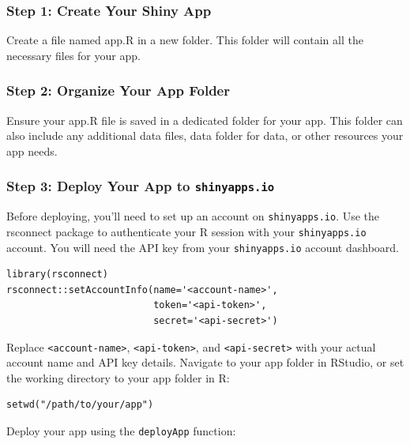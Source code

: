 \documentclass[
]{book}
\begin{document}
\hypertarget{step-1-create-your-shiny-app}{%
\subsubsection{Step 1: Create Your Shiny App}\label{step-1-create-your-shiny-app}}

Create a file named app.R in a new folder. This folder will contain all the necessary files for your app.

\hypertarget{step-2-organize-your-app-folder}{%
\subsubsection{Step 2: Organize Your App Folder}\label{step-2-organize-your-app-folder}}

Ensure your app.R file is saved in a dedicated folder for your app. This folder can also include any additional data files, data folder for data, or other resources your app needs.

\hypertarget{step-3-deploy-your-app-to-shinyapps.io}{%
\subsubsection{\texorpdfstring{Step 3: Deploy Your App to \texttt{shinyapps.io}}{Step 3: Deploy Your App to shinyapps.io}}\label{step-3-deploy-your-app-to-shinyapps.io}}

Before deploying, you'll need to set up an account on \texttt{shinyapps.io}. Use the rsconnect package to authenticate your R session with your \texttt{shinyapps.io} account. You will need the API key from your \texttt{shinyapps.io} account dashboard.

\begin{verbatim}
library(rsconnect)
rsconnect::setAccountInfo(name='<account-name>',
                          token='<api-token>',
                          secret='<api-secret>')
\end{verbatim}

Replace \texttt{\textless{}account-name\textgreater{}}, \texttt{\textless{}api-token\textgreater{}}, and \texttt{\textless{}api-secret\textgreater{}} with your actual account name and API key details. Navigate to your app folder in RStudio, or set the working directory to your app folder in R:

\begin{verbatim}
setwd("/path/to/your/app")
\end{verbatim}

Deploy your app using the \texttt{deployApp} function:
\end{document}

